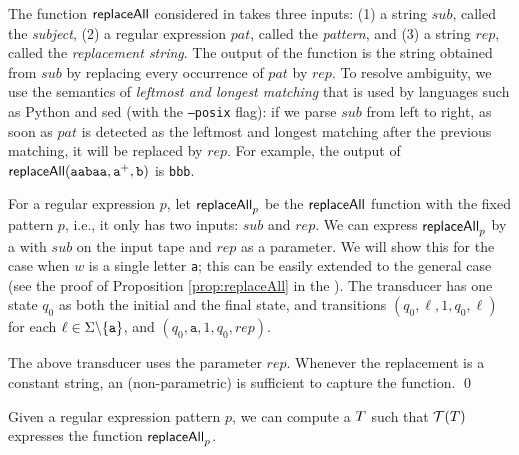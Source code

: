 \begin{example}
    The function $\mathsf{replaceAll}$ considered in \cite{CCHLW18} takes three inputs:
    (1) a string $sub$, called the \emph{subject}, (2) a regular expression
    $pat$, called the \emph{pattern}, and (3) a string $rep$, called
    the \emph{replacement string}. The output of the function is
    the string obtained from $sub$ by replacing every occurrence of $pat$ 
    by $rep$. To resolve ambiguity, we use the semantics of \emph{leftmost
    and longest matching} that is used by languages such as Python and sed (with the
    \texttt{--posix} flag): if we parse $sub$ from left to right, as soon as 
    $pat$ is detected as the leftmost and longest matching after the previous matching, it will be replaced by $rep$. For example, the
    output of $\mathsf{replaceAll}(\texttt{aabaa},\texttt{a}^+,\texttt{b})$ is
    \texttt{bbb}.

    For a regular expression $p$, let $\mathsf{replaceAll}_{p}$ be the $\mathsf{replaceAll}$ function with the fixed pattern $p$,
    i.e., it only has two inputs: $sub$ and $rep$. We can express
    $\mathsf{replaceAll}_{p}$ by a \PT{} with $sub$ on the input
    tape and $rep$ as a parameter. We will show this for the case when $w$ is 
    a single letter \texttt{a}; this can be easily extended to the general case 
    (see the proof of Proposition \ref{prop:replaceAll} in the 
    ). The transducer has one state $q_0$ as both the initial and the final state,
    and transitions 
    $(q_0,\ell, 1, q_0, \ell)$ for each $\ell \in \Sigma \backslash
    \{\texttt{a}\}$, 
    and $(q_0, \texttt{a}, 1, q_0, rep)$.

    The above transducer uses the parameter $rep$. Whenever the replacement
    is a constant string, an (non-parametric) \FT{} is sufficient to
    capture the function. \qed
\end{example}

\begin{proposition}\label{prop-replace-pt}
    Given a regular expression pattern $p$, we can compute a 
    \PT{} $T$ such that $\mathcal{T}(T)$ expresses the function $\mathsf{replaceAll}_p$.
    \label{prop:replaceAll}
\end{proposition}

